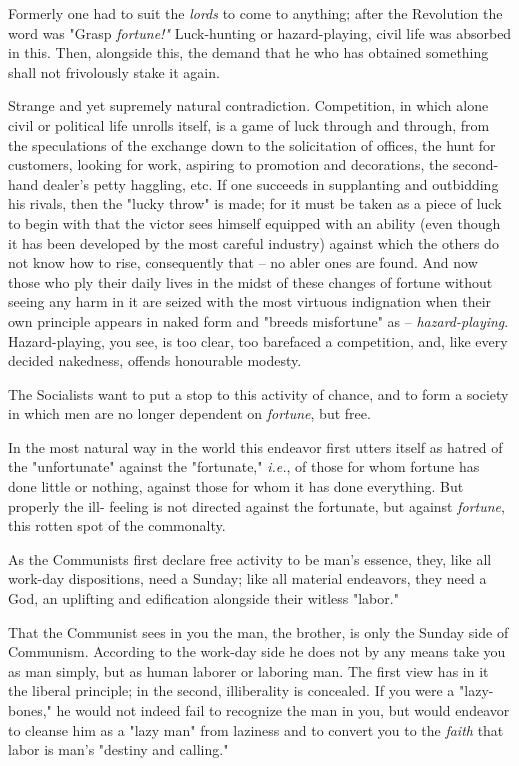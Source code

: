 \documentclass[a4paper]{book}
\begin{document}
Formerly one had to suit the \textit{lords} to come to anything; after the 
Revolution the word was "{}Grasp \textit{fortune!"{}} Luck-hunting or 
hazard-playing, civil life was absorbed in this. Then, alongside this, the 
demand that he who has obtained something shall not frivolously stake it 
again.

Strange and yet supremely natural contradiction. Competition, in which alone 
civil or political life unrolls itself, is a game of luck through and through, 
from the speculations of the exchange down to the solicitation of offices, the 
hunt for customers, looking for work, aspiring to promotion and decorations, 
the second-hand dealer's petty haggling, etc. If one succeeds in supplanting 
and outbidding his rivals, then the "{}lucky throw"{} is made; for it must be 
taken as a piece of luck to begin with that the victor sees himself equipped 
with an ability (even though it has been developed by the most careful 
industry) against which the others do not know how to rise, consequently that 
-- no abler ones are found. And now those who ply their daily lives in the 
midst of these changes of fortune without seeing any harm in it are seized 
with the most virtuous indignation when their own principle appears in naked 
form and "{}breeds misfortune"{} as -- \textit{hazard-playing}. 
Hazard-playing, you see, is too clear, too barefaced a competition, and, like 
every decided nakedness, offends honourable modesty.

The Socialists want to put a stop to this activity of chance, and to form a 
society in which men are no longer dependent on \textit{fortune}, but free.

In the most natural way in the world this endeavor first utters itself as 
hatred of the "{}unfortunate"{} against the "{}fortunate,"{} \textit{i.e.}, of 
those for whom fortune has done little or nothing, against those for whom it 
has done everything. But properly the ill- feeling is not directed against the 
fortunate, but against \textit{fortune}, this rotten spot of the commonalty.

As the Communists first declare free activity to be man's essence, they, like 
all work-day dispositions, need a Sunday; like all material endeavors, they 
need a God, an uplifting and edification alongside their witless "{}labor."{}

That the Communist sees in you the man, the brother, is only the Sunday side 
of Communism. According to the work-day side he does not by any means take you 
as man simply, but as human laborer or laboring man. The first view has in it 
the liberal principle; in the second, illiberality is concealed. If you were a 
"{}lazy-bones,"{} he would not indeed fail to recognize the man in you, but 
would endeavor to cleanse him as a "{}lazy man"{} from laziness and to convert 
you to the \textit{faith} that labor is man's "{}destiny and calling."{}
\end{document}
